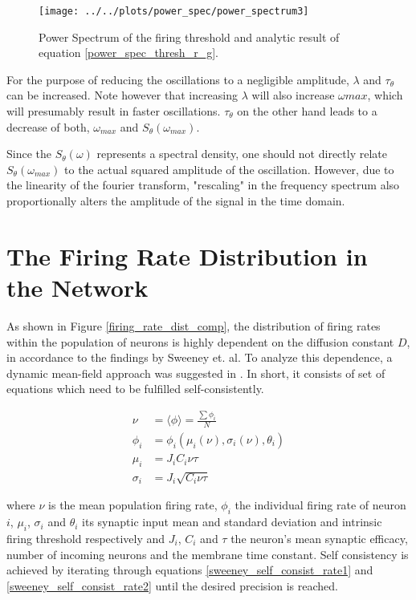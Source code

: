 \documentclass[10pt,a4paper]{article}
\begin{document}
\begin{figure}
\texttt{[image: ../../plots/power\_spec/power\_spectrum3]}
\caption{Power Spectrum of the firing threshold and analytic result of equation \eqref{power_spec_thresh_r_g}.}
\label{power_spec_thresh_sim_vs_an}
\end{figure}

For the purpose of reducing the oscillations to a negligible amplitude, $\lambda$ and $\tau_\theta$ can be increased. Note however that increasing $\lambda$ will also increase $\omega{max}$, which will presumably result in faster oscillations. $\tau_\theta$ on the other hand leads to a decrease of both, $\omega_{max}$ and $S_\theta(\omega_{max})$.

Since the $S_\theta(\omega)$ represents a spectral density, one should not directly relate $S_\theta(\omega_{max})$ to the actual squared amplitude of the oscillation. However, due to the linearity of the fourier transform, "rescaling" in the frequency spectrum also proportionally alters the amplitude of the signal in the time domain.    

\section{The Firing Rate Distribution in the Network}

As shown in Figure \ref{firing_rate_dist_comp}, the distribution of firing rates within the population of neurons is highly dependent on the diffusion constant $D$, in accordance to the findings by Sweeney et. al. To analyze this dependence, a dynamic mean-field approach was suggested in \cite{Sweeney_Paper}. In short, it consists of set of equations which need to be fulfilled self-consistently.

\begin{align}
\nu &= \langle \phi \rangle = \frac{\sum \phi_i}{N} \label{sweeney_self_consist_rate1} \\
\phi_i &= \phi_i(\mu_i(\nu),\sigma_i(\nu),\theta_i) \label{sweeney_self_consist_rate2} \\
\mu_i &= J_iC_i\nu \tau \label{sweeney_self_consist_rate3} \\
\sigma_i &= J_i\sqrt{C_i\nu  \tau} \label{sweeney_self_consist_rate4}
\end{align}


where $\nu$ is the mean population firing rate, $\phi_i$ the individual firing rate of neuron $i$, $\mu_i$, $\sigma_i$ and $\theta_i$ its synaptic input mean and standard deviation and intrinsic firing threshold respectively and $J_i$, $C_i$ and $\tau$ the neuron's mean synaptic efficacy, number of incoming neurons and the membrane time constant. Self consistency is achieved by iterating through equations \eqref{sweeney_self_consist_rate1} and \eqref{sweeney_self_consist_rate2} until the desired precision is reached.
\end{document}
